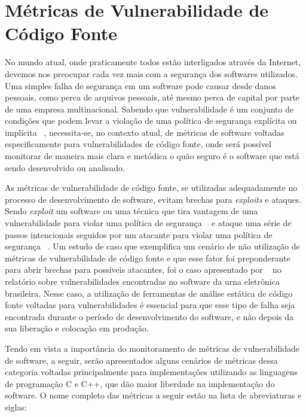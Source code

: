 \section{Métricas de Vulnerabilidade de Código Fonte} \label{cap:metricas_vuln}

No mundo atual, onde praticamente todos estão interligados através da Internet, devemos nos preocupar cada vez mais com a 
segurança dos softwares utilizados. Uma simples falha de segurança em um software pode causar desde danos pessoais, como perca 
de arquivos pessoais, até mesmo perca de capital por parte de uma empresa multinacional. Sabendo que vulnerabilidade é um 
conjunto de condições que podem levar a violação de uma política de segurança explícita ou implícita 
~\cite{seacord&householder2005}, necessita-se, no contexto atual, de métricas de software voltadas especificamente para 
vulnerabilidades de código fonte, onde será possível monitorar de maneira mais clara e metódica o quão seguro é o software que 
está sendo desenvolvido ou analisado.

As métricas de vulnerabilidade de código fonte, se utilizadas adequadamente no processo de desenvolvimento de software, evitam
brechas para \textit{exploits} e ataques. Sendo \textit{exploit} um software ou uma técnica que tira vantagem de uma 
vulnerabilidade para violar uma política de segurança ~\cite{seacord&householder2005} e ataque uma série de passos intencionais 
seguidos por um atacante para violar uma política de segurança ~\cite{howard&longstaff98}. Um estudo de caso que exemplifica 
um cenário de não utilização de métricas de vulnerabilidade de código fonte e que esse fator foi preponderante para abrir
brechas para possíveis atacantes, foi o caso apresentado por ~ no relatório sobre vulnerabilidades 
encontradas no software da urna eletrônica brasileira. Nesse caso, a utilização de ferramentas de análise estática de código
fonte voltadas para vulnerabilidades é essencial para que esse tipo de falha seja encontrada durante o período de 
desenvolvimento do software, e não depois da sua liberação e colocação em produção.

Tendo em vista a importância do monitoramento de métricas de vulnerabilidade de software, a seguir, serão apresentados alguns
cenários de métricas dessa categoria voltadas principalmente para implementações utilizando as linguagens de programação C e 
C++, que dão maior liberdade na implementação do software. O nome completo das métricas a seguir estão na lista de abreviaturas 
e siglas:

